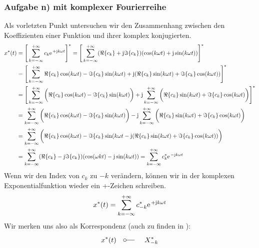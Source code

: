 \documentclass[11pt,a4paper,DIV=12]{scrartcl}
\begin{document}
\subsubsection*{Aufgabe n) mit komplexer Fourierreihe}
Als vorletzten Punkt untersuchen wir den Zusammenhang zwischen den Koeffizienten einer Funktion und ihrer komplex konjugierten.
\begin{align}
	x^*(t)&=\Bigg [\sum_{k=-\infty}^{+\infty}c_k\e^{+\im k \omega t}\Bigg ]^*=\Bigg [\sum_{k=-\infty}^{+\infty}(\Re\{c_k\}+\im\Im\{c_k\})(\cos(k\omega t)+\im\sin(k\omega t))\Bigg ]^*\nonumber \\
	&=\Bigg [\sum_{k=-\infty}^{+\infty}\Re\{c_k\}\cos(k\omega t)-\Im\{c_k\}\sin(k\omega t)+\im (\Re\{c_k\}\sin(k\omega t)+\Im\{c_k\}\cos(k\omega t)) \Bigg ]^*\nonumber \\
	&=\Bigg [\sum_{k=-\infty}^{+\infty}\bigg (\Re\{c_k\}\cos(k\omega t)-\Im\{c_k\}\sin(k\omega t)\bigg )+\im\sum_{k=-\infty}^{+\infty}\bigg (\Re\{c_k\}\sin(k\omega t)+\Im\{c_k\}\cos(k\omega t)\bigg )\Bigg ]^*\nonumber \\
	&=\sum_{k=-\infty}^{+\infty}\bigg (\Re\{c_k\}\cos(k\omega t)-\Im\{c_k\}\sin(k\omega t)\bigg )-\im\sum_{k=-\infty}^{+\infty}\bigg (\Re\{c_k\}\sin(k\omega t)+\Im\{c_k\}\cos(k\omega t)\bigg )\nonumber \\
	&=\sum_{k=-\infty}^{+\infty}\bigg (\Re\{c_k\}\cos(k\omega t)-\Im\{c_k\}\sin(k\omega t-\im(\Re\{c_k\}\sin(k\omega t)+\Im\{c_k\}\cos(k\omega t))\bigg )\nonumber \\
	\label{eq:ComplexConjugatedFourierSeries}
	&=\sum_{k=-\infty}^{+\infty}(\Re\{c_k\}-\im\Im\{c_k\})(\cos(\omega k t)-\im\sin(k\omega t) )=\sum_{k=-\infty}^{+\infty}c_k^*\e^{-\im k \omega t}
\end{align}
Wenn wir den Index von $c_k$ zu $-k$ verändern, können wir in der komplexen Exponentialfunktion wieder ein +-Zeichen schreiben.
\begin{align}
	x^*(t)=\sum_{k=-\infty}^{+\infty}c_{-k}^*\e^{+\im k \omega t}
\end{align}
Wir merken uns also als Korrespondenz (auch zu finden in \cite[S. 208]{Oppenheim1997_2}):
\begin{align}
	x^*(t)\quad\fourier\quad X_{-k}^*
\end{align}
\newpage
\end{document}
